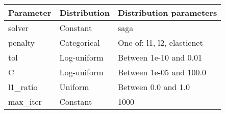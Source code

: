 \begin{tabular}{lll}
\toprule
Parameter & Distribution &    Distribution parameters \\
\midrule
   solver &     Constant &                       saga \\
  penalty &  Categorical & One of: l1, l2, elasticnet \\
      tol &  Log-uniform &     Between 1e-10 and 0.01 \\
        C &  Log-uniform &    Between 1e-05 and 100.0 \\
 l1\_ratio &      Uniform &        Between 0.0 and 1.0 \\
 max\_iter &     Constant &                       1000 \\
\bottomrule
\end{tabular}
